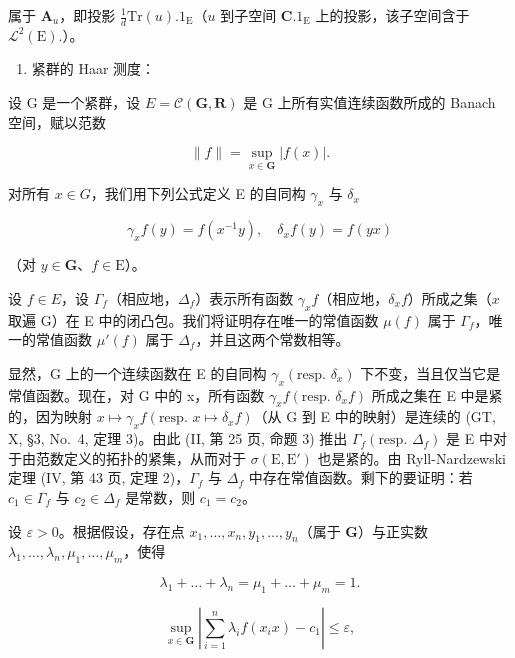 属于 \(\mathbf{A}_u\)，即投影 \(\frac{1}{d}\mathrm{Tr}(u).1_{\mathrm{E}}\)（\(u\) 到子空间 \(\mathbf{C}.1_{\mathrm{E}}\) 上的投影，该子空间含于 \(\mathcal{L}^2 (\mathrm{E}).\)）。

\begin{enumerate}
\def\labelenumi{\Alph{enumi})}
\setcounter{enumi}{2}
\tightlist
\item
  紧群的 Haar 测度：
\end{enumerate}

设 G 是一个紧群，设 \(E = \mathcal{C}(\mathbf{G}, \mathbf{R})\) 是 G 上所有实值连续函数所成的 Banach 空间，赋以范数

\[
\| f \| = \sup _ {x \in \mathbf {G}} | f (x) |.\tag{4}
\]

对所有 \(x \in G\)，我们用下列公式定义 E 的自同构 \(\gamma_{x}\) 与 \(\delta_{x}\)

\[
\gamma_ {x} f (y) = f \left(x ^ {- 1} y\right), \quad \delta_ {x} f (y) = f (y x)\tag{5}
\]

（对 \(y \in \mathbf{G}\)、\(f \in \mathrm{E}\)）。

设 \(f \in E\)，设 \(\Gamma_f\)（相应地，\(\Delta_f\)）表示所有函数 \(\gamma_x f\)（相应地，\(\delta_x f\)）所成之集（\(x\) 取遍 G）在 E 中的闭凸包。我们将证明存在唯一的常值函数 \(\mu(f)\) 属于 \(\Gamma_f\)，唯一的常值函数 \(\mu'(f)\) 属于 \(\Delta_f\)，并且这两个常数相等。

显然，G 上的一个连续函数在 E 的自同构 \(\gamma_{x}(\text{resp. } \delta_{x})\) 下不变，当且仅当它是常值函数。现在，对 G 中的 x，所有函数 \(\gamma_{x}f(\text{resp. } \delta_{x}f)\) 所成之集在 E 中是紧的，因为映射 \(x \mapsto \gamma_{x}f(\text{resp. } x \mapsto \delta_{x}f)\)（从 G 到 E 中的映射）是连续的 (GT, X, §3, No.~4, 定理 3)。由此 (II, 第 25 页, 命题 3) 推出 \(\Gamma_{f}(\text{resp. } \Delta_{f})\) 是 E 中对于由范数定义的拓扑的紧集，从而对于 \(\sigma(\text{E}, \text{E}')\) 也是紧的。由 Ryll-Nardzewski 定理 (IV, 第 43 页, 定理 2)，\(\Gamma_{f}\) 与 \(\Delta_{f}\) 中存在常值函数。剩下的要证明：若 \(c_{1} \in \Gamma_{f}\) 与 \(c_{2} \in \Delta_{f}\) 是常数，则 \(c_{1} = c_{2}\)。

设 \(\varepsilon > 0\)。根据假设，存在点 \(x_{1}, \ldots, x_{n}, y_{1}, \ldots, y_{n}\)（属于 \(\mathbf{G}\)）与正实数 \(\lambda_{1}, \ldots, \lambda_{n}, \mu_{1}, \ldots, \mu_{m}\)，使得

\[
\lambda_ {1} + \dots + \lambda_ {n} = \mu_ {1} + \dots + \mu_ {m} = 1.\tag{6}
\]

\[
\sup _ {x \in \mathbf {G}} \left| \sum_ {i = 1} ^ {n} \lambda_ {i} f (x _ {i} x) - c _ {1} \right| \leqslant \varepsilon ,\tag{7}
\]

